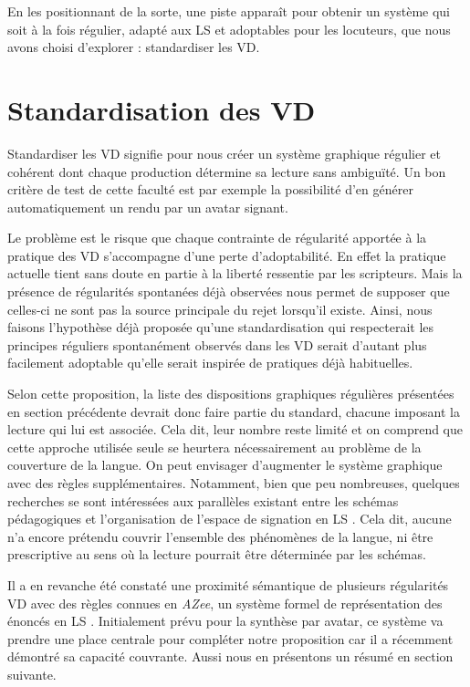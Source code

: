 \documentclass[french,utf8x]{article}
\begin{document}
En les positionnant de la sorte, une piste apparaît pour obtenir un système qui soit à la fois régulier, adapté aux LS et adoptables pour les locuteurs, que nous avons choisi d'explorer : standardiser les VD.


\section{Standardisation des VD}

Standardiser les VD signifie pour nous créer un système graphique régulier et cohérent dont chaque production détermine sa lecture sans ambiguïté.
Un bon critère de test de cette faculté est par exemple la possibilité d'en générer automatiquement un rendu par un avatar signant.

Le problème est le risque que chaque contrainte de régularité apportée à la pratique des VD s'accompagne d'une perte d'adoptabilité.
En effet la pratique actuelle tient sans doute en partie à la liberté ressentie par les scripteurs.
Mais la présence de régularités spontanées déjà observées nous permet de supposer que celles-ci ne sont pas la source principale du rejet lorsqu'il existe.
Ainsi, nous faisons l'hypothèse déjà proposée \cite{SLS-2020-writing} qu'une standardisation qui respecterait les principes réguliers spontanément observés dans les VD serait d'autant plus facilement adoptable qu'elle serait inspirée de pratiques déjà habituelles.

Selon cette proposition, la liste des dispositions graphiques régulières présentées en section précédente devrait donc faire partie du standard, chacune imposant la lecture qui lui est associée.
Cela dit, leur nombre reste limité et on comprend que cette approche utilisée seule se heurtera nécessairement au problème de la couverture de la langue.
On peut envisager d'augmenter le système graphique avec des règles supplémentaires.
Notamment, bien que peu nombreuses, quelques recherches se sont intéressées aux parallèles existant entre les schémas pédagogiques et l'organisation de l'espace de signation en LS \cite{gui07}.
Cela dit, aucune n'a encore prétendu couvrir l'ensemble des phénomènes de la langue, ni être prescriptive au sens où la lecture pourrait être déterminée par les schémas.

Il a en revanche été constaté une proximité sémantique de plusieurs régularités VD avec des règles connues en \emph{AZee}, un système formel de représentation des énoncés en LS \cite{challant2022-corpusAZee}.
Initialement prévu pour la synthèse par avatar, ce système va prendre une place centrale pour compléter notre proposition car il a récemment démontré sa capacité couvrante.
Aussi nous en présentons un résumé en section suivante.
\end{document}
